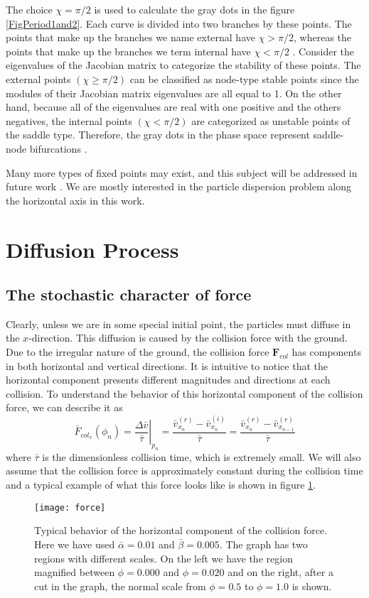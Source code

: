 \documentclass[reprint, aps, pre,nofootinbib]{revtex4-1}
\begin{document}
The choice $\chi=\pi/2$ is used to calculate the gray dots in the
figure \ref{FigPeriod1and2}. Each curve is divided into two branches
by these points. The points that make up the branches we name external
have $\chi>\pi/2$, whereas the points that make up the branches we
term internal have $\chi<\pi/2$ . Consider the eigenvalues of the
Jacobian matrix to categorize the stability of these points. The external
points $\left(\chi\geq\pi/2\right)$ can be classified as node-type
stable points since the modules of their Jacobian matrix eigenvalues
are all equal to 1. On the other hand, because all of the eigenvalues
are real with one positive and the others negatives, the internal
points $\left(\chi<\pi/2\right)$ are categorized as unstable points
of the saddle type. Therefore, the gray dots in the phase space represent
saddle-node bifurcations \citep{Kuznetsov1995}.

Many more types of fixed points may exist, and this subject will be
addressed in future work \citep{Barreiro2}. We are mostly interested
in the particle dispersion problem along the horizontal axis in this
work.

\section{Diffusion Process}

\subsection{The stochastic character of force}

Clearly, unless we are in some special initial point, the particles
must diffuse in the $x$-direction. This diffusion is caused by the
collision force with the ground. Due to the irregular nature of the
ground, the collision force $\boldsymbol{F}_{col}$ has components
in both horizontal and vertical directions. It is intuitive to notice
that the horizontal component presents different magnitudes and directions
at each collision. To understand the behavior of this horizontal component
of the collision force, we can describe it as
\[
\bar{F}_{col_{x}}(\phi_{n})=\left.\frac{\Delta\bar{v}}{\bar{\tau}}\right|_{p_{n}}=\frac{\bar{v}_{x_{n}}^{(r)}-\bar{v}_{x_{n}}^{(i)}}{\bar{\tau}}=\frac{\bar{v}_{x_{n}}^{(r)}-\bar{v}_{x_{n-1}}^{(r)}}{\bar{\tau}}
\]
where $\bar{\tau}$ is the dimensionless collision time, which is
extremely small. We will also assume that the collision force is approximately
constant during the collision time and a typical example of what this
force looks like is shown in figure \ref{fig:Force}.
\begin{figure}[h]
\centering{}\texttt{[image: force]}\caption{Typical behavior of the horizontal component of the collision force.
Here we have used $\bar{\alpha}=0.01$ and $\bar{\beta}=0.005$. The
graph has two regions with different scales. On the left we have the
region magnified between $\phi=0.000$ and $\phi=0.020$ and on the
right, after a cut in the graph, the normal scale from $\phi=0.5$
to $\phi=1.0$ is shown.}
\label{fig:Force}
\end{figure}
\end{document}
